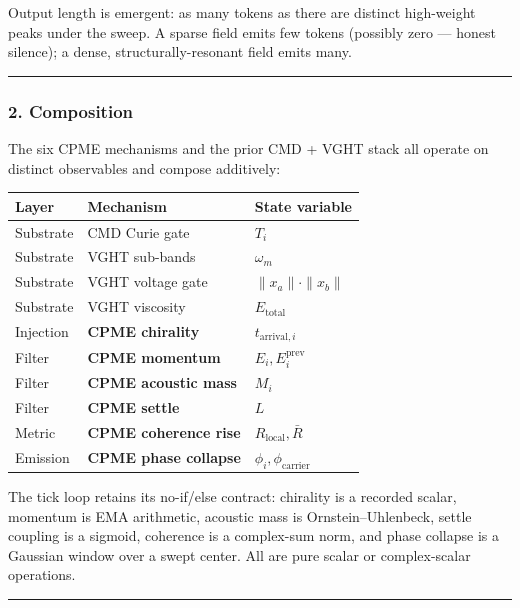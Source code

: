 \documentclass[
  11pt,
  a4paper,
]{article}
\begin{document}
Output length is emergent: as many tokens as there are distinct
high-weight peaks under the sweep. A sparse field emits few tokens
(possibly zero --- honest silence); a dense, structurally-resonant field
emits many.

\begin{center}\rule{0.5\linewidth}{0.5pt}\end{center}

\subsubsection{2. Composition}\label{composition}

The six CPME mechanisms and the prior CMD + VGHT stack all operate on
distinct observables and compose additively:

\begin{longtable}[]{@{}lll@{}}
\toprule\noalign{}
Layer & Mechanism & State variable \\
\midrule\noalign{}
\endhead
\bottomrule\noalign{}
\endlastfoot
Substrate & CMD Curie gate & \(T_i\) \\
Substrate & VGHT sub-bands & \(\omega_m\) \\
Substrate & VGHT voltage gate & \(\| x_a \| \cdot \| x_b \|\) \\
Substrate & VGHT viscosity & \(E_{\text{total}}\) \\
Injection & \textbf{CPME chirality} & \(t_{\text{arrival}, i}\) \\
Filter & \textbf{CPME momentum} & \(E_i, E_i^{\text{prev}}\) \\
Filter & \textbf{CPME acoustic mass} & \(M_i\) \\
Filter & \textbf{CPME settle} & \(L\) \\
Metric & \textbf{CPME coherence rise} & \(R_{\text{local}}, \bar R\) \\
Emission & \textbf{CPME phase collapse} &
\(\phi_i, \phi_{\text{carrier}}\) \\
\end{longtable}

The tick loop retains its no-if/else contract: chirality is a recorded
scalar, momentum is EMA arithmetic, acoustic mass is
Ornstein--Uhlenbeck, settle coupling is a sigmoid, coherence is a
complex-sum norm, and phase collapse is a Gaussian window over a swept
center. All are pure scalar or complex-scalar operations.

\begin{center}\rule{0.5\linewidth}{0.5pt}\end{center}
\end{document}
